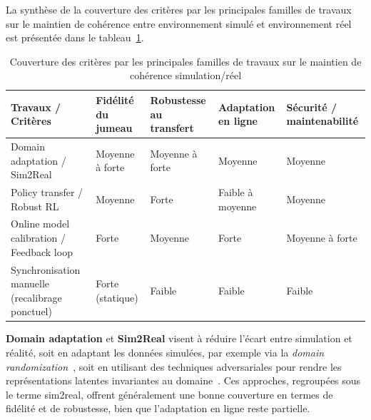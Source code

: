 La synthèse de la couverture des critères par les principales familles de travaux sur le maintien de cohérence entre environnement simulé et environnement réel est présentée dans le tableau~\ref{tab:couverture_criteres_travaux_trf}.

\begin{table}[h!]
  \centering
  \caption{Couverture des critères par les principales familles de travaux sur le maintien de cohérence simulation/réel}
  \label{tab:couverture_criteres_travaux_trf}
  \scriptsize
  \begin{tabular}{|p{4.5cm}|p{2cm}|p{2cm}|p{2cm}|p{2.5cm}|}
    \hline
    \textbf{Travaux / Critères}                                                       & \textbf{Fidélité du jumeau} & \textbf{Robustesse au transfert} & \textbf{Adaptation en ligne} & \textbf{Sécurité / maintenabilité} \\
    \hline
    Domain adaptation / Sim2Real~\cite{tobin2017domain,ganin2016domain}               & Moyenne à forte             & Moyenne à forte                  & Moyenne                      & Moyenne                            \\
    \hline
    Policy transfer / Robust RL~\cite{pinto2017robust}                                & Moyenne                     & Forte                            & Faible à moyenne             & Moyenne                            \\
    \hline
    Online model calibration / Feedback loop~\cite{deisenroth2011pilco}               & Forte                       & Moyenne                          & Forte                        & Moyenne à forte                    \\
    \hline
    Synchronisation manuelle (recalibrage ponctuel)~\cite{Standen2021,cyberbattlesim} & Forte (statique)            & Faible                           & Faible                       & Faible                             \\
    \hline
  \end{tabular}
\end{table}

\noindent
\textbf{Domain adaptation} et \textbf{Sim2Real} visent à réduire l’écart entre simulation et réalité, soit en adaptant les données simulées, par exemple via la \textit{domain randomization}~\cite{tobin2017domain}, soit en utilisant des techniques adversariales pour rendre les représentations latentes invariantes au domaine~\cite{ganin2016domain}. Ces approches, regroupées sous le terme sim2real, offrent généralement une bonne couverture en termes de fidélité et de robustesse, bien que l’adaptation en ligne reste partielle.

